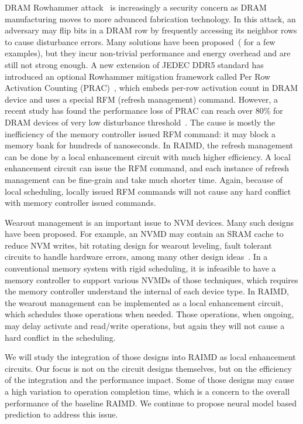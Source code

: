 \documentclass[11pt]{article}
\begin{document}
DRAM Rowhammer attack~\cite{kim2014flipping,kim2020revisiting} is increasingly a security concern
as DRAM manufacturing moves to more advanced fabrication technology.  In this
attack, an adversary may flip bits in a DRAM row by frequently accessing its
neighbor rows to cause disturbance errors.  Many solutions have been
proposed~(\cite{aweke2016anvil,you2019mrloc,wang:iccd21} for a few examples), but they incur non-trivial performance
and energy overhead and are still not strong enough.  A new extension of JEDEC
DDR5 standard has introduced an optional Rowhammer mitigation framework called
Per Row Activation Counting (PRAC)~\cite{JEDEC:2024}, which embeds per-row
activation count in DRAM device and uses a special RFM (refresh management)
command.  However, a recent study has found the performance loss of PRAC can
reach over 80\% for DRAM devices of very low disturbance
threshold~\cite{Canpolat:hpca25}.  The cause is mostly the inefficiency of the
memory controller issued RFM command: it may block a memory bank for hundreds of
nanoseconds.  In RAIMD, the refresh management can be done by a local
enhancement circuit with much higher efficiency.  A local enhancement circuit
can issue the RFM command, and each instance of refresh management can be
fine-grain and take much shorter time.  Again, because of local scheduling,
locally issued RFM commands will not cause any hard conflict with memory
controller issued commands.

Wearout management is an important issue to NVM devices.  Many such designs have
been proposed.  For example, an NVMD may contain an SRAM cache to reduce NVM
writes, bit rotating design for wearout leveling, fault tolerant circuits to
handle hardware errors, among many other design
ideas~\cite{Lee:ISCA09,Zhou:ISCA09,Qureshi:ISCA09,Qureshi:HPCA10}.  In a
conventional memory system with rigid scheduling, it is infeasible to have a
memory controller to support various NVMDs of those techniques, which requires
the memory controller understand the internal of each device type.  In RAIMD,
the wearout management can be implemented as a local enhancement circuit, which
schedules those operations when needed.  Those operations, when ongoing, may
delay activate and read/write operations, but again they will not cause a hard
conflict in the scheduling.

We will study the integration of those designs into RAIMD as local enhancement
circuits.  Our focus is not on the circuit designs themselves, but on the
efficiency of the integration and the performance impact.  Some of those designs
may cause a high variation to operation completion time, which is a concern to
the overall performance of the baseline RAIMD.  We continue to propose neural
model based prediction to address this issue.
\end{document}
